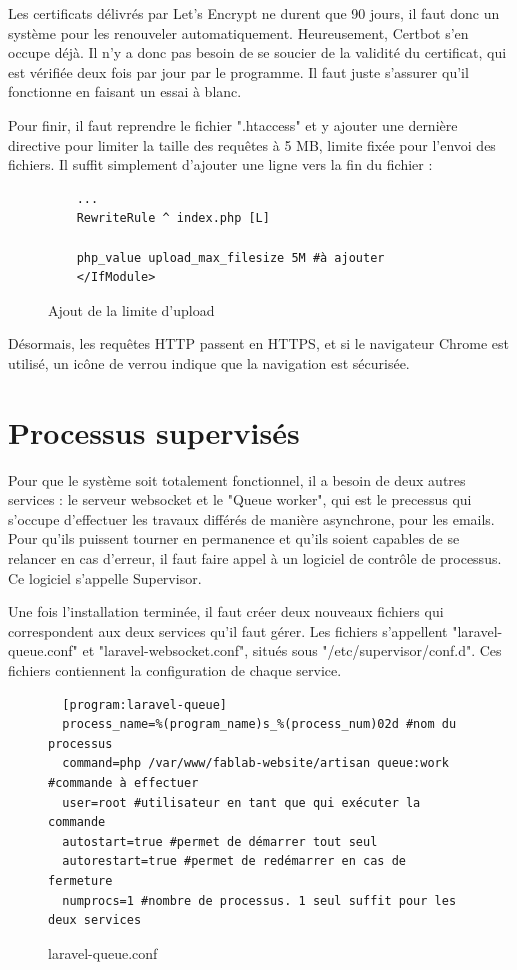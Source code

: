 \documentclass[
    iai, %
    eai, %
]{heig-tb}
\begin{document}
Les certificats délivrés par Let's Encrypt ne durent que 90 jours, il faut donc un système pour les renouveler automatiquement. Heureusement, Certbot s'en occupe déjà. Il n'y a donc pas besoin de se soucier de la validité du certificat, qui est vérifiée deux fois par jour par le programme. Il faut juste s'assurer qu'il fonctionne en faisant un essai à blanc.

Pour finir, il faut reprendre le fichier ".htaccess" et y ajouter une dernière directive pour limiter la taille des requêtes à 5 MB, limite fixée pour l'envoi des fichiers. Il suffit simplement d'ajouter une ligne vers la fin du fichier :

\begin{figure}[h]
  \begin{verbatim}
    ...
    RewriteRule ^ index.php [L]

    php_value upload_max_filesize 5M #à ajouter
    </IfModule>
  \end{verbatim}
  \caption{Ajout de la limite d'upload}
\end{figure}

Désormais, les requêtes HTTP passent en HTTPS, et si le navigateur Chrome est utilisé, un icône de verrou indique que la navigation est sécurisée.

\newpage
\section{Processus supervisés}
Pour que le système soit totalement fonctionnel, il a besoin de deux autres services : le serveur websocket et le "Queue worker", qui est le precessus qui s'occupe d'effectuer les travaux différés de manière asynchrone, pour les emails. Pour qu'ils puissent tourner en permanence et qu'ils soient capables de se relancer en cas d'erreur, il faut faire appel à un logiciel de contrôle de processus.
Ce logiciel s'appelle Supervisor.

Une fois l'installation terminée, il faut créer deux nouveaux fichiers qui correspondent aux deux services qu'il faut gérer. Les fichiers s'appellent "laravel-queue.conf" et "laravel-websocket.conf", situés sous "/etc/supervisor/conf.d". Ces fichiers contiennent la configuration de chaque service.

\begin{figure}[h]
  \begin{verbatim}
  [program:laravel-queue]
  process_name=%(program_name)s_%(process_num)02d #nom du processus
  command=php /var/www/fablab-website/artisan queue:work #commande à effectuer
  user=root #utilisateur en tant que qui exécuter la commande
  autostart=true #permet de démarrer tout seul
  autorestart=true #permet de redémarrer en cas de fermeture
  numprocs=1 #nombre de processus. 1 seul suffit pour les deux services
  \end{verbatim}
  \caption{laravel-queue.conf}
\end{figure}
\end{document}
